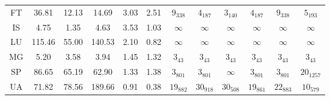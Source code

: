 \begin{table}[t]
\begin{minipage}{\textwidth}
\begin{center}
\begin{tabu}{c|ccc|cc|c|ccccc}
      FT & 36.81 & 12.13 & 14.69 & 3.03 & 2.51 & $9_\textit{338}$ &  $4_\textit{187}$ &  $3_\textit{140}$ &  $4_\textit{187}$ &  $9_\textit{338}$ &  $5_\textit{193}$\\
      IS & 4.75 & 1.35 & 4.63 & 3.53 & 1.03 & $\infty$ &  $\infty$ &  $\infty$ &  $\infty$ &  $\infty$ &  $\infty$\\
      LU & 115.46 & 55.00 & 140.53 & 2.10 & 0.82 & $\infty$ &  $\infty$ &  $\infty$ &  $\infty$ &  $\infty$ &  $\infty$\\
      MG & 5.20 & 3.58 & 3.94 & 1.45 & 1.32 & $3_\textit{43}$ &  $3_\textit{43}$ &  $3_\textit{43}$ &  $3_\textit{43}$ &  $3_\textit{43}$ &  $3_\textit{43}$\\
      SP & 86.65 & 65.19 & 62.90 & 1.33 & 1.38 & $3_\textit{801}$ &  $3_\textit{801}$ &  $\infty$ &  $3_\textit{801}$ &  $3_\textit{801}$ &  $20_\textit{1257}$\\
      UA & 71.82 & 78.56 & 189.66 & 0.91 & 0.38 & $19_\textit{882}$ &  $30_\textit{918}$ &  $30_\textit{508}$ &  $19_\textit{861}$ &  $22_\textit{883}$ &  $10_\textit{579}$\\\hline
      \end{tabu}
  \end{center}
\end{minipage}
\end{table}

